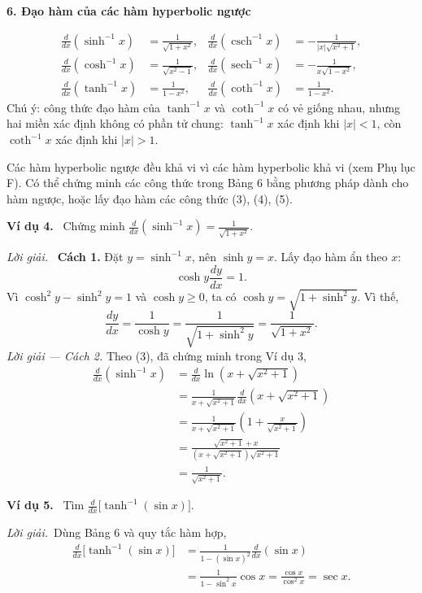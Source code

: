 \documentclass[12pt,a4paper]{article}
\newcommand{\ex}[1]{\par\medskip\noindent\textbf{Ví dụ #1.}\ }
\newcommand{\sol}{\par\nopagebreak[4]\noindent\textit{Lời giải.}\ }
\newcommand{\group}[1]{\par\medskip\noindent\textbf{#1}\par\nopagebreak[4]}
\DeclareMathOperator{\sech}{sech}
\DeclareMathOperator{\csch}{csch}
\begin{document}
\group{6. Đạo hàm của các hàm hyperbolic ngược}
\begin{align*}
\frac d{dx}(\sinh^{-1}x)&=\frac1{\sqrt{1+x^2}},&
\frac d{dx}(\csch^{-1}x)&=-\frac1{|x|\sqrt{x^2+1}},\\
\frac d{dx}(\cosh^{-1}x)&=\frac1{\sqrt{x^2-1}},&
\frac d{dx}(\sech^{-1}x)&=-\frac1{x\sqrt{1-x^2}},\\
\frac d{dx}(\tanh^{-1}x)&=\frac1{1-x^2},&
\frac d{dx}(\coth^{-1}x)&=\frac1{1-x^2}.
\end{align*}
Chú ý: công thức đạo hàm của $\tanh^{-1}x$ và $\coth^{-1}x$ có vẻ giống nhau, nhưng hai miền xác định không có phần tử chung: $\tanh^{-1}x$ xác định khi $|x|<1$, còn $\coth^{-1}x$ xác định khi $|x|>1$.

Các hàm hyperbolic ngược đều khả vi vì các hàm hyperbolic khả vi (xem Phụ lục F). Có thể chứng minh các công thức trong Bảng 6 bằng phương pháp dành cho hàm ngược, hoặc lấy đạo hàm các công thức (3), (4), (5).

\ex{4} Chứng minh $\displaystyle\frac d{dx}(\sinh^{-1}x)=\frac1{\sqrt{1+x^2}}$.
\sol\textbf{ Cách 1.} Đặt $y=\sinh^{-1}x$, nên $\sinh y=x$. Lấy đạo hàm ẩn theo $x$:
\[\cosh y\frac{dy}{dx}=1.\]
Vì $\cosh^2y-\sinh^2y=1$ và $\cosh y\ge0$, ta có $\cosh y=\sqrt{1+\sinh^2y}$. Vì thế,
\[\frac{dy}{dx}=\frac1{\cosh y}=\frac1{\sqrt{1+\sinh^2y}}=\frac1{\sqrt{1+x^2}}.\]
\noindent\textit{Lời giải — Cách 2.} Theo (3), đã chứng minh trong Ví dụ 3,
\begin{align*}
\frac d{dx}(\sinh^{-1}x)&=\frac d{dx}\ln\left(x+\sqrt{x^2+1}\right)\\
&=\frac1{x+\sqrt{x^2+1}}\frac d{dx}\left(x+\sqrt{x^2+1}\right)\\
&=\frac1{x+\sqrt{x^2+1}}\left(1+\frac{x}{\sqrt{x^2+1}}\right)\\
&=\frac{\sqrt{x^2+1}+x}{(x+\sqrt{x^2+1})\sqrt{x^2+1}}\\
&=\frac1{\sqrt{x^2+1}}.
\end{align*}

\ex{5} Tìm $\displaystyle\frac d{dx}\bigl[\tanh^{-1}(\sin x)\bigr]$.
\sol Dùng Bảng 6 và quy tắc hàm hợp,
\begin{align*}
\frac d{dx}\bigl[\tanh^{-1}(\sin x)\bigr]
&=\frac1{1-(\sin x)^2}\frac d{dx}(\sin x)\\
&=\frac1{1-\sin^2x}\cos x=\frac{\cos x}{\cos^2x}=\sec x.
\end{align*}

\clearpage
\end{document}
